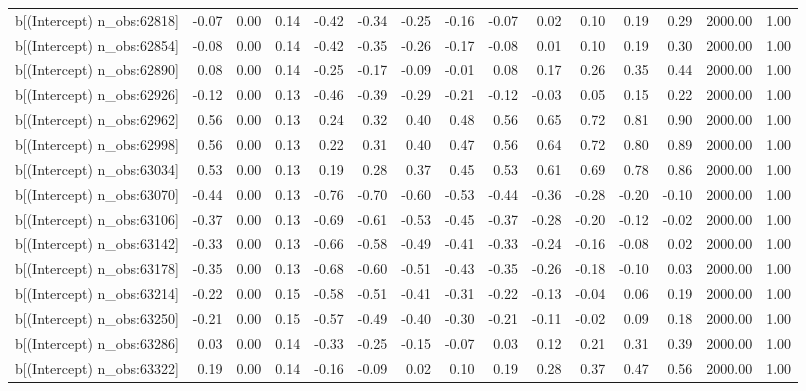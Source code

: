 \begin{table}[ht]
\begin{tabular}{rrrrrrrrrrrrrrr}
  b[(Intercept) n\_obs:62818] & -0.07 & 0.00 & 0.14 & -0.42 & -0.34 & -0.25 & -0.16 & -0.07 & 0.02 & 0.10 & 0.19 & 0.29 & 2000.00 & 1.00 \\ 
  b[(Intercept) n\_obs:62854] & -0.08 & 0.00 & 0.14 & -0.42 & -0.35 & -0.26 & -0.17 & -0.08 & 0.01 & 0.10 & 0.19 & 0.30 & 2000.00 & 1.00 \\ 
  b[(Intercept) n\_obs:62890] & 0.08 & 0.00 & 0.14 & -0.25 & -0.17 & -0.09 & -0.01 & 0.08 & 0.17 & 0.26 & 0.35 & 0.44 & 2000.00 & 1.00 \\ 
  b[(Intercept) n\_obs:62926] & -0.12 & 0.00 & 0.13 & -0.46 & -0.39 & -0.29 & -0.21 & -0.12 & -0.03 & 0.05 & 0.15 & 0.22 & 2000.00 & 1.00 \\ 
  b[(Intercept) n\_obs:62962] & 0.56 & 0.00 & 0.13 & 0.24 & 0.32 & 0.40 & 0.48 & 0.56 & 0.65 & 0.72 & 0.81 & 0.90 & 2000.00 & 1.00 \\ 
  b[(Intercept) n\_obs:62998] & 0.56 & 0.00 & 0.13 & 0.22 & 0.31 & 0.40 & 0.47 & 0.56 & 0.64 & 0.72 & 0.80 & 0.89 & 2000.00 & 1.00 \\ 
  b[(Intercept) n\_obs:63034] & 0.53 & 0.00 & 0.13 & 0.19 & 0.28 & 0.37 & 0.45 & 0.53 & 0.61 & 0.69 & 0.78 & 0.86 & 2000.00 & 1.00 \\ 
  b[(Intercept) n\_obs:63070] & -0.44 & 0.00 & 0.13 & -0.76 & -0.70 & -0.60 & -0.53 & -0.44 & -0.36 & -0.28 & -0.20 & -0.10 & 2000.00 & 1.00 \\ 
  b[(Intercept) n\_obs:63106] & -0.37 & 0.00 & 0.13 & -0.69 & -0.61 & -0.53 & -0.45 & -0.37 & -0.28 & -0.20 & -0.12 & -0.02 & 2000.00 & 1.00 \\ 
  b[(Intercept) n\_obs:63142] & -0.33 & 0.00 & 0.13 & -0.66 & -0.58 & -0.49 & -0.41 & -0.33 & -0.24 & -0.16 & -0.08 & 0.02 & 2000.00 & 1.00 \\ 
  b[(Intercept) n\_obs:63178] & -0.35 & 0.00 & 0.13 & -0.68 & -0.60 & -0.51 & -0.43 & -0.35 & -0.26 & -0.18 & -0.10 & 0.03 & 2000.00 & 1.00 \\ 
  b[(Intercept) n\_obs:63214] & -0.22 & 0.00 & 0.15 & -0.58 & -0.51 & -0.41 & -0.31 & -0.22 & -0.13 & -0.04 & 0.06 & 0.19 & 2000.00 & 1.00 \\ 
  b[(Intercept) n\_obs:63250] & -0.21 & 0.00 & 0.15 & -0.57 & -0.49 & -0.40 & -0.30 & -0.21 & -0.11 & -0.02 & 0.09 & 0.18 & 2000.00 & 1.00 \\ 
  b[(Intercept) n\_obs:63286] & 0.03 & 0.00 & 0.14 & -0.33 & -0.25 & -0.15 & -0.07 & 0.03 & 0.12 & 0.21 & 0.31 & 0.39 & 2000.00 & 1.00 \\ 
  b[(Intercept) n\_obs:63322] & 0.19 & 0.00 & 0.14 & -0.16 & -0.09 & 0.02 & 0.10 & 0.19 & 0.28 & 0.37 & 0.47 & 0.56 & 2000.00 & 1.00 \\ 

\end{tabular}
\end{table}
